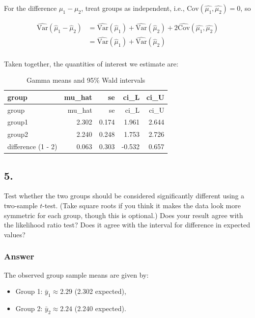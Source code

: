 \documentclass[
]{article}
\begin{document}
\newpage

For the difference \(\mu_1-\mu_2\), treat groups as independent, i.e.,
\(\mathrm{Cov}(\hat{\mu_1}, \hat{\mu_2}) = 0\), so

\[
\begin{aligned}
\widehat{\mathrm{Var}}(\hat\mu_1-\hat\mu_2)
&= \widehat{\mathrm{Var}}(\hat\mu_1)+\widehat{\mathrm{Var}}(\hat\mu_2) + 2\widehat{\mathrm{Cov}}(\hat{\mu_1}, \hat{\mu_2})\\
&= \widehat{\mathrm{Var}}(\hat\mu_1)+\widehat{\mathrm{Var}}(\hat\mu_2) \\ 
\end{aligned}
\]

Taken together, the quantities of interest we estimate are:

\begin{longtable}[]{@{}lrrrr@{}}
\caption{Gamma means and 95\% Wald intervals}\tabularnewline
\toprule\noalign{}
group & mu\_hat & se & ci\_L & ci\_U \\
\midrule\noalign{}
\endfirsthead
\toprule\noalign{}
group & mu\_hat & se & ci\_L & ci\_U \\
\midrule\noalign{}
\endhead
\bottomrule\noalign{}
\endlastfoot
group1 & 2.302 & 0.174 & 1.961 & 2.644 \\
group2 & 2.240 & 0.248 & 1.753 & 2.726 \\
difference (1 - 2) & 0.063 & 0.303 & -0.532 & 0.657 \\
\end{longtable}

\newpage

\subsection{5.}\label{section-4}

Test whether the two groups should be considered significantly different
using a two-sample \(t\)-test. (Take square roots if you think it makes
the data look more symmetric for each group, though this is optional.)
Does your result agree with the likelihood ratio test? Does it agree
with the interval for difference in expected values?

\subsubsection{Answer}\label{answer-4}

The observed group sample means are given by:

\begin{itemize}
\item
  Group 1: \(\bar y_1 \approx 2.29\) (2.302 expected),
\item
  Group 2: \(\bar y_2 \approx 2.24\) (2.240 expected).
\end{itemize}
\end{document}

